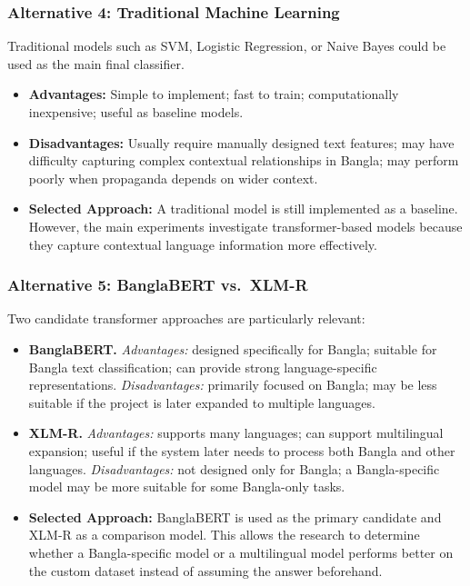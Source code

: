 \subsubsection{Alternative 4: Traditional Machine Learning}
Traditional models such as SVM, Logistic Regression, or Naive Bayes could be used as
the main final classifier.
\begin{itemize}
  \item \textbf{Advantages:} Simple to implement; fast to train; computationally
        inexpensive; useful as baseline models.
  \item \textbf{Disadvantages:} Usually require manually designed text features;
        may have difficulty capturing complex contextual relationships in Bangla;
        may perform poorly when propaganda depends on wider context.
  \item \textbf{Selected Approach:} A traditional model is still implemented as a
        baseline. However, the main experiments investigate transformer-based
        models because they capture contextual language information more
        effectively.
\end{itemize}

\subsubsection{Alternative 5: BanglaBERT vs.\ XLM-R}
Two candidate transformer approaches are particularly relevant:
\begin{itemize}
  \item \textbf{BanglaBERT.} \emph{Advantages:} designed specifically for Bangla;
        suitable for Bangla text classification; can provide strong
        language-specific representations. \emph{Disadvantages:} primarily focused
        on Bangla; may be less suitable if the project is later expanded to
        multiple languages.
  \item \textbf{XLM-R.} \emph{Advantages:} supports many languages; can support
        multilingual expansion; useful if the system later needs to process both
        Bangla and other languages. \emph{Disadvantages:} not designed only for
        Bangla; a Bangla-specific model may be more suitable for some Bangla-only
        tasks.
  \item \textbf{Selected Approach:} BanglaBERT is used as the primary candidate and
        XLM-R as a comparison model. This allows the research to determine whether
        a Bangla-specific model or a multilingual model performs better on the
        custom dataset instead of assuming the answer beforehand.
\end{itemize}

